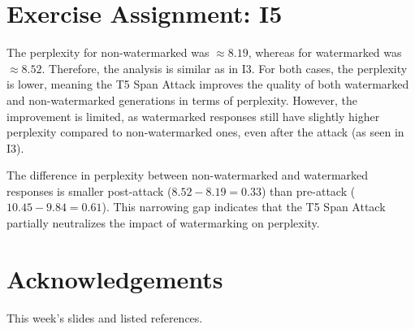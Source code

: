 \documentclass{article}
\begin{document}
\section{Exercise Assignment: I5}\label{sec:i5}
The perplexity for non-watermarked was $\approx 8.19$, whereas for watermarked was $\approx 8.52$. Therefore, the analysis is similar as in I3. For both cases, the perplexity is lower, meaning the T5 Span Attack improves the quality of both watermarked and non-watermarked generations in terms of perplexity. However, the improvement is limited, as watermarked responses still have slightly higher perplexity compared to non-watermarked ones, even after the attack (as seen in I3).

The difference in perplexity between non-watermarked and watermarked responses is smaller post-attack (\( 8.52 - 8.19 = 0.33 \)) than pre-attack (\( 10.45 - 9.84 = 0.61 \)). This narrowing gap indicates that the T5 Span Attack partially neutralizes the impact of watermarking on perplexity.

\clearpage

\section*{Acknowledgements}
This week's slides and listed references.




\clearpage

\end{document}
